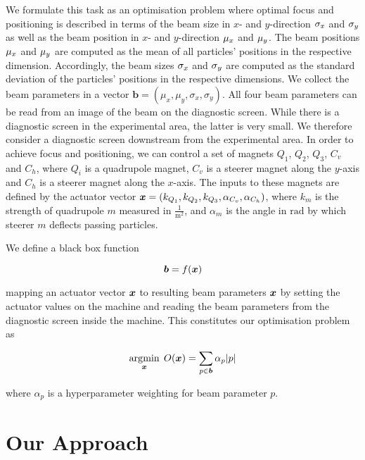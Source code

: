 We formulate this task as an optimisation problem where optimal focus and positioning is described in terms of the beam size in $x$- and $y$-direction $\sigma_x$ and $\sigma_y$ as well as the beam position in $x$- and $y$-direction $\mu_x$ and $\mu_y$. The beam positions $\mu_x$ and $\mu_y$ are computed as the mean of all particles' positions in the respective dimension. Accordingly, the beam sizes $\sigma_x$ and $\sigma_y$ are computed as the standard deviation of the particles' positions in the respective dimensions. We collect the beam parameters in a vector $\bm{b} = (\mu_x, \mu_y, \sigma_x, \sigma_y)$. All four beam parameters can be read from an image of the beam on the diagnostic screen. While there is a diagnostic screen in the experimental area, the latter is very small. We therefore consider a diagnostic screen downstream from the experimental area. In order to achieve focus and positioning, we can control a set of magnets $Q_1$, $Q_2$, $Q_3$, $C_v$ and $C_h$, where $Q_i$ is a quadrupole magnet, $C_v$ is a steerer magnet along the $y$-axis and $C_h$ is a steerer magnet along the $x$-axis. The inputs to these magnets are defined by the actuator vector $\bm{x} = (k_{Q_1}, k_{Q_2}, k_{Q_3}, \alpha_{C_v}, \alpha_{C_h})$, where $k_m$ is the strength of quadrupole $m$ measured in $\frac{1}{\text{m}^2}$, and $\alpha_m$ is the angle in $\unit{\radian}$ by which steerer $m$ deflects passing particles.

We define a black box function

\begin{equation}
    \bm{b} = f(\bm{x})
\end{equation}

mapping an actuator vector $\bm{x}$ to resulting beam parameters $\bm{x}$ by setting the actuator values on the machine and reading the beam parameters from the diagnostic screen inside the machine. This constitutes our optimisation problem as

\begin{equation}
    \operatorname*{\arg\!\min}_{\bm{x}} \; O(\bm{x}) = \sum_{p \in \bm{b}} \alpha_p |p|
\end{equation}

where $\alpha_p$ is a hyperparameter weighting for beam parameter $p$.

\section{Our Approach}

